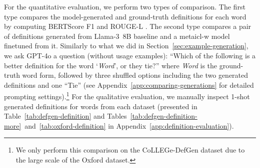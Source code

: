 \documentclass{article}
\begin{document}
For the quantitative evaluation, we perform two types of comparison.
The first type compares the model-generated and ground-truth definitions for each word by computing BERTScore F1 \citep{zhang2019bertscore} and \mbox{ROUGE-L} \citep{lin-2004-rouge}.
The second type compares a pair of definitions generated from \mbox{Llama-3 8B} baseline and a \ac{metaicl-w} model finetuned from it. Similarly to what we did in Section~\ref{sec:example-generation}, we ask \mbox{GPT-4o} a question (without usage examples): ``Which of the following is a better definition for the word `\textit{Word}', or they tie?'' where \textit{Word} is the ground-truth word form, followed by three shuffled options including the two generated definitions and one ``Tie'' (see Appendix~\ref{app:comparing-generations} for detailed prompting settings).\footnote{We only perform this comparison on the CoLLEGe-DefGen dataset due to the large scale of the Oxford dataset.}
For the qualitative evaluation, we manually inspect 1-shot generated definitions for words from each dataset (presented in Table~\ref{tab:defgen-definition} and Tables~\ref{tab:defgen-definition-more}~and~\ref{tab:oxford-definition} in Appendix~\ref{app:definition-evaluation}).
\end{document}
